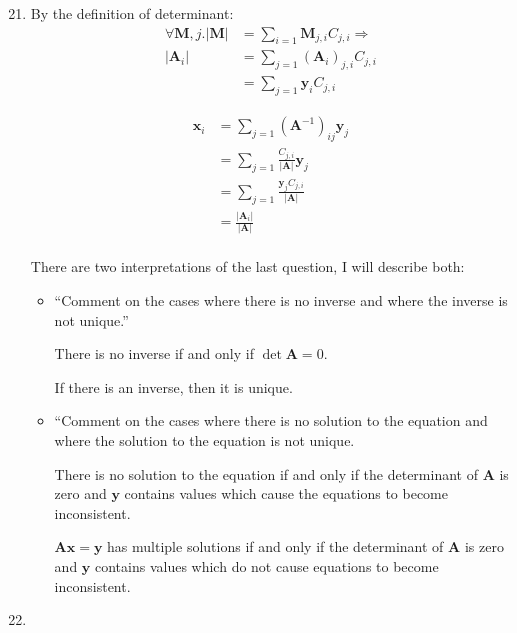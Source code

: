 \documentclass[10pt,oneside,a4paper]{article}
\begin{document}
\begin{enumerate}

\setcounter{enumi}{20}

\item
By the definition of determinant:
\[
\begin{split}
\forall \mathbf{M}, j. |\mathbf{M}| &= \sum_{i=1} \mathbf{M}_{j, i} C_{j, i} \Longrightarrow \\
|\mathbf{A}_i| &= \sum_{j = 1} (\mathbf{A}_i)_{j, i} C_{j, i} \\
&= \sum_{j = 1} \mathbf{y}_i C_{j, i}
\end{split}
\]

\[
\begin{split}
\mathbf{x}_i 
&= \sum_{j = 1} \left( \mathbf{A}^{-1} \right)_{ij}\mathbf{y}_j \\
&= \sum_{j = 1} \frac{C_{j, i}}{|\mathbf{A}|} \mathbf{y}_j \\
&= \sum_{j = 1} \frac{\mathbf{y}_j C_{j, i}}{|\mathbf{A}|} \\
&= \frac{|\mathbf{A}_i|}{|\mathbf{A}|} \\
\end{split}
\]

There are two interpretations of the last question, I will describe both:

\begin{itemize}

\item ``Comment on the cases where there is no inverse and where the inverse is not unique.''

There is no inverse if and only if $\det \mathbf{A} = 0$.

If there is an inverse, then it is unique.

\item ``Comment on the cases where there is no solution to the equation and where the solution to the equation is not
 unique.

There is no solution to the equation if and only if the determinant of $\mathbf{A}$ is zero and $\mathbf{y} $
contains values which cause the equations to become inconsistent.

$\mathbf{A}\mathbf{x} = \mathbf{y} $ has multiple solutions if and only if the determinant of $\mathbf{A}$ is zero and
$\mathbf{y} $ contains values which do not cause equations to become inconsistent.

\end{itemize}

\item 


\end{enumerate}
\end{document}
